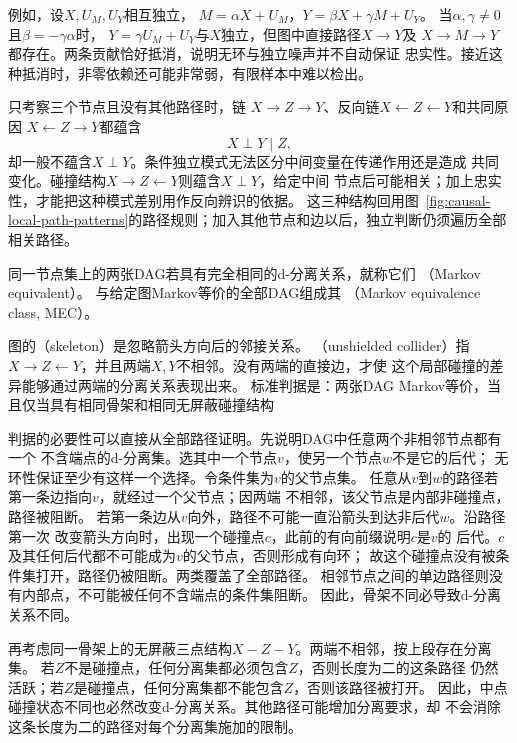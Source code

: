 例如，设\(X,U_M,U_Y\)相互独立，
\(M=\alpha X+U_M\)，\(Y=\beta X+\gamma M+U_Y\)。
当\(\alpha,\gamma\ne0\)且\(\beta=-\gamma\alpha\)时，
\(Y=\gamma U_M+U_Y\)与\(X\)独立，但图中直接路径\(X\to Y\)及
\(X\to M\to Y\)都存在。两条贡献恰好抵消，说明无环与独立噪声并不自动保证
忠实性。接近这种抵消时，非零依赖还可能非常弱，有限样本中难以检出。

只考察三个节点且没有其他路径时，链
\(X\to Z\to Y\)、反向链\(X\leftarrow Z\leftarrow Y\)和共同原因
\(X\leftarrow Z\to Y\)都蕴含
\[
  X\perp Y\mid Z,
\]
却一般不蕴含\(X\perp Y\)。条件独立模式无法区分中间变量在传递作用还是造成
共同变化。碰撞结构\(X\to Z\leftarrow Y\)则蕴含\(X\perp Y\)，给定中间
节点后可能相关；加上忠实性，才能把这种模式差别用作反向辨识的依据。
这三种结构回用图~\ref{fig:causal-local-path-patterns}的路径规则；加入其他节点和边以后，独立判断仍须遍历全部相关路径。

\begin{definition}[Markov等价与等价类]
  \label{def:causal-markov-equivalence}
  同一节点集上的两张DAG若具有完全相同的d-分离关系，就称它们
  （Markov equivalent）。
  与给定图Markov等价的全部DAG组成其
  （Markov equivalence class, MEC）。
\end{definition}

图的（skeleton）是忽略箭头方向后的邻接关系。
（unshielded collider）指
\(X\to Z\leftarrow Y\)，并且两端\(X,Y\)不相邻。没有两端的直接边，才使
这个局部碰撞的差异能够通过两端的分离关系表现出来。
标准判据是：两张DAG Markov等价，当且仅当具有相同骨架和相同无屏蔽碰撞结构

判据的必要性可以直接从全部路径证明。先说明DAG中任意两个非相邻节点都有一个
不含端点的d-分离集。选其中一个节点\(v\)，使另一个节点\(w\)不是它的后代；
无环性保证至少有这样一个选择。令条件集为\(v\)的父节点集。
任意从\(v\)到\(w\)的路径若第一条边指向\(v\)，就经过一个父节点；因两端
不相邻，该父节点是内部非碰撞点，路径被阻断。
若第一条边从\(v\)向外，路径不可能一直沿箭头到达非后代\(w\)。沿路径第一次
改变箭头方向时，出现一个碰撞点\(c\)，此前的有向前缀说明\(c\)是\(v\)的
后代。\(c\)及其任何后代都不可能成为\(v\)的父节点，否则形成有向环；
故这个碰撞点没有被条件集打开，路径仍被阻断。两类覆盖了全部路径。
相邻节点之间的单边路径则没有内部点，不可能被任何不含端点的条件集阻断。
因此，骨架不同必导致d-分离关系不同。

再考虑同一骨架上的无屏蔽三点结构\(X-Z-Y\)。两端不相邻，按上段存在分离集。
若\(Z\)不是碰撞点，任何分离集都必须包含\(Z\)，否则长度为二的这条路径
仍然活跃；若\(Z\)是碰撞点，任何分离集都不能包含\(Z\)，否则该路径被打开。
因此，中点碰撞状态不同也必然改变d-分离关系。其他路径可能增加分离要求，却
不会消除这条长度为二的路径对每个分离集施加的限制。

